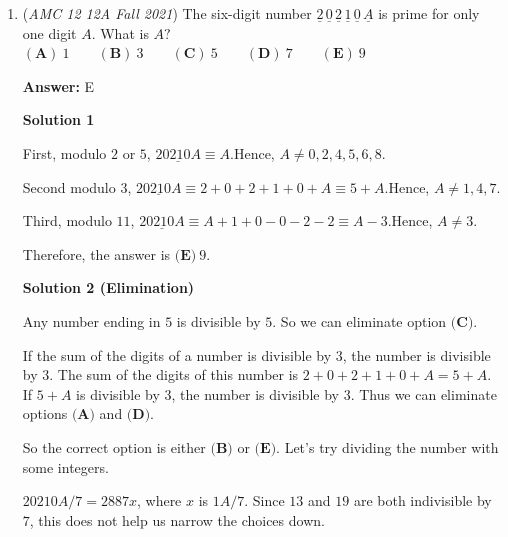 \begin{enumerate}
 For Route B, we have to use the equation twice: once for the distance of $5- \frac{1}{2} = \frac{9}{2}$ miles with a speed of $\frac{2}{3}$ mile per minute and a distance of $\frac{1}{2}$ miles at a speed of $\frac{1}{3}$ mile per minute. Thus, the time it takes to go on Route B is $\frac{9}{2} \cdot \frac{3}{2} + \frac{1}{2} \cdot 3 = \frac{27}{4} + \frac{3}{2} = \frac{33}{4}$ minutes. Thus, Route B is $12 - \frac{33}{4} = \frac{15}{4} = 3\frac{3}{4}$ faster than Route A. Thus, the answer is $\boxed{\textbf{(B)}\  3 \frac{3}{4}}.$



	\item (\textit{AMC 12 12A Fall 2021}) The six-digit number $\underline{2}\,\underline{0}\,\underline{2}\,\underline{1}\,\underline{0}\,\underline{A}$ is prime for only one digit $A.$ What is $A?$
$(\textbf{A})\: 1\qquad(\textbf{B}) \: 3\qquad(\textbf{C}) \: 5 \qquad(\textbf{D}) \: 7\qquad(\textbf{E}) \: 9$

 \textbf{Answer: }E



\textbf{Solution 1}

First, modulo $2$ or $5$, $\underline{20210A} \equiv A$.Hence, $A \neq 0, 2, 4, 5, 6, 8$.

 Second modulo $3$, $\underline{20210A} \equiv 2 + 0 + 2 + 1 + 0 + A \equiv 5 + A$.Hence, $A \neq 1, 4, 7$.

 Third, modulo $11$, $\underline{20210A} \equiv A + 1 + 0 - 0 - 2 - 2 \equiv A - 3$.Hence, $A \neq 3$.

 Therefore, the answer is $\boxed{\textbf{(E)}\ 9}$.

 



\textbf{Solution 2 (Elimination)}

Any number ending in $5$ is divisible by $5$. So we can eliminate option $\textbf{(C)}$.

 If the sum of the digits of a number is divisible by $3$, the number is divisible by $3$. The sum of the digits of this number is $2 + 0 + 2 + 1 + 0 + A = 5 + A$. If $5 + A$ is divisible by $3$, the number is divisible by $3$. Thus we can eliminate options $\textbf{(A)}$ and $\textbf{(D)}$.

 So the correct option is either $\textbf{(B)}$ or $\textbf{(E)}$. Let's try dividing the number with some integers.

 $20210A/7 = 2887x$, where $x$ is $1A/7$. Since $13$ and $19$ are both indivisible by $7$, this does not help us narrow the choices down.


\end{enumerate}
